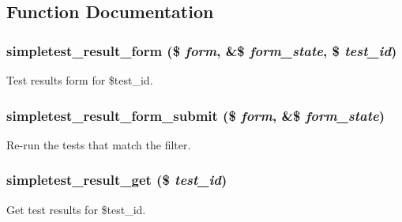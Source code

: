 \subsection{Function Documentation}
\hypertarget{simpletest_8pages_8inc_a7e446dcd8d33e6ec0081c6dc2ecead51}{
\subsubsection[{simpletest\_\-result\_\-form}]{\setlength{\rightskip}{0pt plus 5cm}simpletest\_\-result\_\-form (\$ {\em form}, \/  \&\$ {\em form\_\-state}, \/  \$ {\em test\_\-id})}}
\label{simpletest_8pages_8inc_a7e446dcd8d33e6ec0081c6dc2ecead51}
Test results form for \$test\_\-id. \hypertarget{simpletest_8pages_8inc_aa49754acf61555f23482a0257db56da2}{
\subsubsection[{simpletest\_\-result\_\-form\_\-submit}]{\setlength{\rightskip}{0pt plus 5cm}simpletest\_\-result\_\-form\_\-submit (\$ {\em form}, \/  \&\$ {\em form\_\-state})}}
\label{simpletest_8pages_8inc_aa49754acf61555f23482a0257db56da2}
Re-\/run the tests that match the filter. \hypertarget{simpletest_8pages_8inc_a36d253fe9ff7de21a484f1bb0ff9b5a6}{
\subsubsection[{simpletest\_\-result\_\-get}]{\setlength{\rightskip}{0pt plus 5cm}simpletest\_\-result\_\-get (\$ {\em test\_\-id})}}
\label{simpletest_8pages_8inc_a36d253fe9ff7de21a484f1bb0ff9b5a6}
Get test results for \$test\_\-id.


